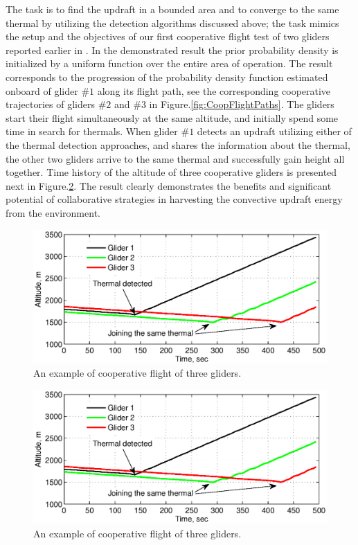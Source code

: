 \documentclass[letterpaper, 10 pt, conference]{ieeeconf}  %
\begin{document}
The task is to find the updraft in a bounded area and to converge to the same thermal by utilizing the detection algorithms discussed above; the task mimics the setup and the objectives of our first cooperative flight test of two gliders reported earlier in \cite{AKlass_JGCD:2012}. In the demonstrated
result the prior probability density is initialized by a uniform function over the entire area of operation. The result corresponds to the progression of the probability density function estimated onboard of glider $\#1$ along its flight path, see the corresponding cooperative trajectories of gliders
$\#2$ and $\#3$ in Figure.\ref{fig:CoopFlightPaths}. The gliders start their flight simultaneously at the same altitude, and initially spend some time in search for thermals. When glider $\#1$ detects an updraft utilizing either of the thermal detection approaches, and shares the information about the thermal, the other two gliders arrive to the same thermal and successfully gain height all together. Time history of the altitude of three cooperative gliders is presented next in
Figure.\ref{fig:CoopFlightHeight}. The result clearly demonstrates the benefits and significant potential of collaborative strategies in harvesting the convective updraft energy from the environment.
\begin{figure}[thpb]
  \centering
  \includegraphics[scale=0.39]{Figures/Coop_gain_altitude.eps}
  \caption{An example of cooperative flight of three gliders.}
  \label{fig:CoopFlightHeight}
\end{figure}
\begin{figure}[thpb]
  \centering
  \includegraphics[scale=0.39]{Figures/Coop_gain_altitude.eps}
  \caption{An example of cooperative flight of three gliders.}
  \label{fig:CoopFlightHeight}
\end{figure}
\end{document}
